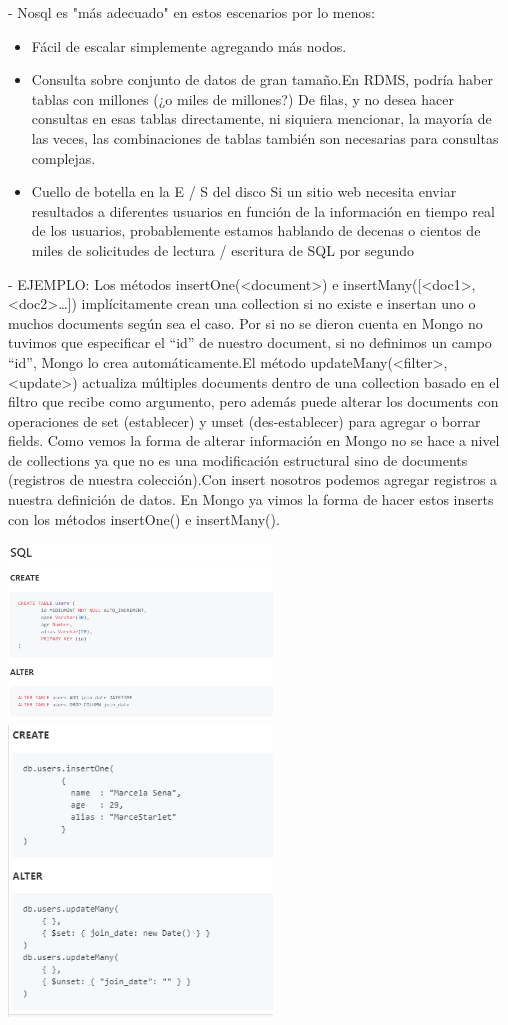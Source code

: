 \documentclass[%
 reprint,
 amsmath,amssymb,
 aps,
]{revtex4-1}
\begin{document}
- Nosql es "más adecuado" en estos escenarios por lo menos:
   \begin{itemize}
		\item Fácil de escalar simplemente agregando más nodos.
		\item Consulta sobre conjunto de datos de gran tamaño.En RDMS, podría haber tablas con millones (¿o miles de millones?) De filas, y no desea hacer consultas en esas tablas directamente, ni siquiera mencionar, la mayoría de las veces, las combinaciones de tablas también son necesarias para consultas complejas.
		\item Cuello de botella en la E / S del disco Si un sitio web necesita enviar resultados a diferentes usuarios en función de la información en tiempo real de los usuarios, probablemente estamos hablando de decenas o cientos de miles de solicitudes de lectura / escritura de SQL por segundo\cite{No}
	\end{itemize}
- EJEMPLO:
Los métodos insertOne(<document>) e insertMany([<doc1>,<doc2>…]) implícitamente crean una collection si no existe e insertan uno o muchos documents según sea el caso. Por si no se dieron cuenta en Mongo no tuvimos que especificar el “id” de nuestro document, si no definimos un campo “id”, Mongo lo crea automáticamente.El método updateMany(<filter>,<update>) actualiza múltiples documents dentro de una collection basado en el filtro que recibe como argumento, pero además puede alterar los documents con operaciones de set (establecer) y unset (des-establecer) para agregar o borrar fields. Como vemos la forma de alterar información en Mongo no se hace a nivel de collections ya que no es una modificación estructural sino de documents (registros de nuestra colección).Con insert nosotros podemos agregar registros a nuestra definición de datos. En Mongo ya vimos la forma de hacer estos inserts con los métodos insertOne() e insertMany().\cite{NoSQL}

	\begin{center}
	\includegraphics[width=7cm]{./Imagenes/4}
          \includegraphics[width=7cm]{./Imagenes/5}
	\end{center}
\end{document}
